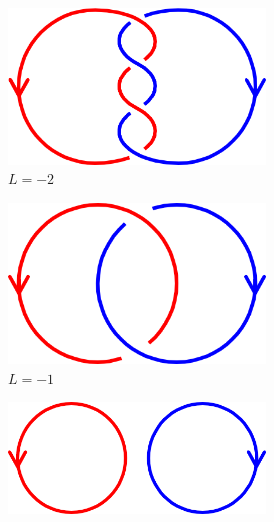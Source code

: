    \begin{figure}[!ht]
        \centering
        \begin{subfigure}{0.1868\textwidth}
            \centering
            \includegraphics[width = 0.75\textwidth]{2 - fluid component/3 - MHD structures/2 - global/images/-2.png}
            \caption{$L = -2$}
        \end{subfigure}%
        \begin{subfigure}{0.1811\textwidth}
            \centering
            \includegraphics[width = 0.75\textwidth]{2 - fluid component/3 - MHD structures/2 - global/images/-1.png}
            \caption{$L = -1$}
        \end{subfigure}%
        \begin{subfigure}{0.2634\textwidth}
            \centering
            \includegraphics[width = 0.75\textwidth]{2 - fluid component/3 - MHD structures/2 - global/images/0.png}

\end{subfigure}
\end{figure}
